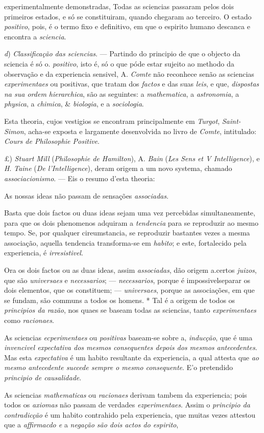 experimentalmente demonstradas, Todas as sciencias passaram pelos dois primeiros estados, e só se constituiram, quando chegaram ao terceiro. O estado \emph{positivo}, pois, é o termo fixo e definitivo, em que o espirito humano descanca e encontra a \emph{sciencia}.\par \emph{d}) \emph{Classificação das sciencias}. --- Partindo do principio de que o objecto da sciencia é só o. \emph{positivo}, isto é, só o que póde estar sujeito ao methodo da observação e da experiencia sensivel, A. \emph{Comte} não reconhece senão as sciencias \emph{experimentaes} ou positivas, que tratam dos \emph{factos} e das suas \emph{leis}, e que, \emph{dispostas na sua ordem hierarchica}, são as seguintes: a \emph{mathematica}, a \emph{astronomia}, a \emph{physica}, a \emph{chimica}, \& \emph{biologia}, e a \emph{sociologia}.\par Esta theoria, cujos vestigios se encontram principalmente em \emph{Turgot}, \emph{Saint-Simon}, acha-se exposta e largamente desenvolvida no livro de \emph{Comte}, intitulado: \emph{Cours de Philosophie Positive}.\par £) \emph{Stuart Mill} (\emph{Philosophie de Hamilton}), A. \emph{Bain} (\emph{Les Sens et V Intelligence}), e \emph{H}. \emph{Taine} (\emph{De l'Intelligence}), deram origem a um novo systema, chamado \emph{associacionismo}. --- Eis o resumo d'esta theoria:\par As nossas ideas não passam de sensações \emph{associadas}.\par Basta que dois factos ou duas ideas sejam uma vez percebidas simultaneamente, para que os dois phenomenos adquiram a \emph{tendencia} para se reproduzir ao mesmo tempo. Se, por qualquer cireumstancia, se reproduzir bastantes vezes a mesma associação, aquella tendencia transforma-se em \emph{habito}; e este, fortalecido pela experiencia, é \emph{irresistivel}.\par Ora os dois factos ou as duas ideas, assim \emph{associadas}, dão origem a.certos \emph{juizos}, que são \emph{universaes} e \emph{necessarios}; --- \emph{necessarios}, porque é impossivelseparar os dois elementos, que os constituem; --- \emph{universaes}, porque as associações, em que se fundam, são communs a todos os homens. * Tal é a origem de todos os \emph{principios da razão}, nos quaes se baseam todas as sciencias, tanto \emph{experimentaes} como \emph{racionaes}.\par As sciencias \emph{ecperimentaes} ou \emph{positivas} baseam-se sobre a, \emph{inducção}, que é uma \emph{invencivel expectativa dos mesmos consequentes depois dos mesmos antecedentes}. Mas esta \emph{expectativa} é um habito resultante da experiencia, a qual attesta que \emph{ao mesmo antecedente succede sempre o mesmo consequente}. E'o pretendido \emph{principio de causalidade}.\par As sciencias \emph{mathematicas} ou \emph{racionaes} derivam tambem da experiencia; pois todos os \emph{axiomas} não passam de verdades \emph{ezperimentaes}. Assim o \emph{principio da contradicção} é um habito contrahido pela experiencia, que muitas vezes attestou que a \emph{affirmacdo e} a \emph{negação são dois actos do espirito}, 